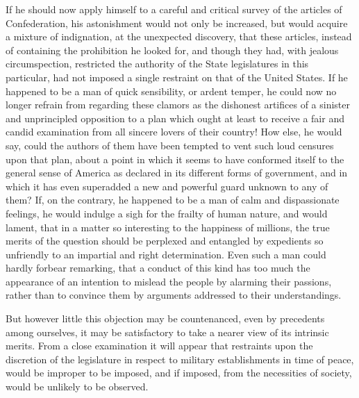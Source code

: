If he should now apply himself to a careful and critical survey of the articles of Confederation, his astonishment would not only be increased, but would acquire a mixture of indignation, at the unexpected discovery, that these articles, instead of containing the prohibition he looked for, and though they had, with jealous circumspection, restricted the authority of the State legislatures in this particular, had not imposed a single restraint on that of the United States. 
If he happened to be a man of quick sensibility, or ardent temper, he could now no longer refrain from regarding these clamors as the dishonest artifices of a sinister and unprincipled opposition to a plan which ought at least to receive a fair and candid examination from all sincere lovers of their country! 
How else, he would say, could the authors of them have been tempted to vent such loud censures upon that plan, about a point in which it seems to have conformed itself to the general sense of America as declared in its different forms of government, and in which it has even superadded a new and powerful guard unknown to any of them? 
If, on the contrary, he happened to be a man of calm and dispassionate feelings, he would indulge a sigh for the frailty of human nature, and would lament, that in a matter so interesting to the happiness of millions, the true merits of the question should be perplexed and entangled by expedients so unfriendly to an impartial and right determination. 
Even such a man could hardly forbear remarking, that a conduct of this kind has too much the appearance of an intention to mislead the people by alarming their passions, rather than to convince them by arguments addressed to their understandings.

But however little this objection may be countenanced, even by precedents among ourselves, it may be satisfactory to take a nearer view of its intrinsic merits. 
From a close examination it will appear that restraints upon the discretion of the legislature in respect to military establishments in time of peace, would be improper to be imposed, and if imposed, from the necessities of society, would be unlikely to be observed.

